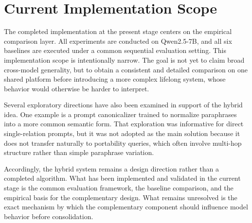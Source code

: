 \section{Current Implementation Scope}

The completed implementation at the present stage centers on the empirical comparison layer. All experiments are conducted on Qwen2.5-7B, and all six baselines are executed under a common sequential evaluation setting. This implementation scope is intentionally narrow. The goal is not yet to claim broad cross-model generality, but to obtain a consistent and detailed comparison on one shared platform before introducing a more complex lifelong system, whose behavior would otherwise be harder to interpret.

Several exploratory directions have also been examined in support of the hybrid idea. One example is a prompt canonicalizer trained to normalize paraphrases into a more common semantic form. That exploration was informative for direct single-relation prompts, but it was not adopted as the main solution because it does not transfer naturally to portability queries, which often involve multi-hop structure rather than simple paraphrase variation.

Accordingly, the hybrid system remains a design direction rather than a completed algorithm. What has been implemented and validated in the current stage is the common evaluation framework, the baseline comparison, and the empirical basis for the complementary design. What remains unresolved is the exact mechanism by which the complementary component should influence model behavior before consolidation.

